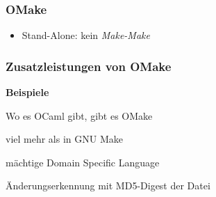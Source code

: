 \begin{frame}
	\frametitle{OMake}
	\begin{itemize}
		\item Stand-Alone: kein \emph{Make-Make}
	\end{itemize}
\end{frame}

\begin{frame}
	\frametitle{Zusatzleistungen von OMake}
	\textbf{Beispiele}
	\begin{description}[Abhängigkeitsanalyse]
		\item[Portabilität] Wo es OCaml gibt, gibt es OMake
		\item[implizite Regeln] viel mehr als in GNU Make
		\item[Programmierbarkeit] mächtige Domain Specific Language
		\item[Abhängigkeitsanalyse] Änderungserkennung mit MD5-Digest der Datei
		\item[Fortschrittsanzeige] 
	\end{description}
\end{frame}
